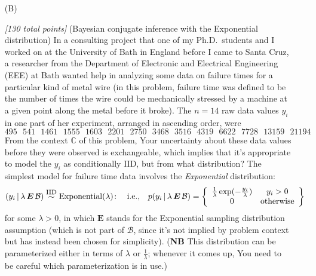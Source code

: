 \documentclass[12pt]{article}
\newcommand{\given}{\, | \,}
\newenvironment{solution}{\begin{proof}[\textbf{\textit{Solution}}] }{\end{proof}}
\begin{document}
\begin{itemize}
\begin{itemize}
\begin{tcolorbox}[breakable]
\begin{solution}
        \textbf{Policy Implications:} \\
        Good: 495,000 HIV+ people would be told know they have HIV+.

        Bad: 8,725,00 people would be told they're HIV+ when they're not.

        Because a gold standard test wasn't developed until later, this would be disastrous. This is because we're telling about 9 million Americans that they have HIV when they indeed don't. 

    \end{solution}
\end{tcolorbox}

\end{itemize}


\item[(B)]

\textit{[130 total points]} (Bayesian conjugate inference with the Exponential distribution) In a consulting project that one of my Ph.D.~students and I worked on at the University of Bath in England before I came to Santa Cruz, a researcher from the Department of Electronic and Electrical Engineering (EEE) at Bath wanted help in analyzing some data on failure times for a particular kind of metal wire (in this problem, failure time was defined to be the number of times the wire could be mechanically stressed by a machine at a given point along the metal before it broke). The $n = 14$ raw data values $y_i$ in one part of her experiment, arranged in ascending order, were 
\[ 
495 \ \ \ 541 \ \ \ 1461 \ \ \ 1555 \ \ \ 1603 \ \ \ 2201 \ \ \ 2750 \ \ \
3468 \ \ \ 3516 \ \ \ 4319 \ \ \ 6622 \ \ \ 7728 \ \ \ 13159 \ \ \ 21194 
\] 
From the context $\mathbb{ C }$ of this problem, Your uncertainty about these data values before they were observed is exchangeable, which implies that it's appropriate to model the $y_i$ as conditionally IID, but from what distribution?
The simplest model for failure time data involves the \textit{Exponential} distribution: 
\begin{equation} \label{e:exponential-model-1}
( y_i \given \lambda \, \bm{ E } \, \mathcal{ B } ) \stackrel{ \mbox{\footnotesize IID} }{ \sim } \textrm{Exponential} ( \lambda ) \! : \ \ \ \textrm{i.e.,} \ \ \ p( y_i \given \lambda \, \bm{ E } \, \mathcal{ B } ) = \left\{ \begin{array}{cc} \frac{ 1 }{ \lambda } \exp( - \frac{
y_i }{ \lambda } ) & y_i > 0 \\ 0 & \mbox{otherwise} \end{array} \right\}
\end{equation}
for some $\lambda > 0$, in which $\bm{ E }$ stands for the Exponential sampling distribution assumption (which is not part of $\mathcal{ B }$, since it's not implied by problem context but has instead been chosen for simplicity). (\textbf{NB} This distribution can be parameterized either in terms of $\lambda$ or $\frac{ 1 }{ \lambda }$; whenever it comes up, You need to be careful which parameterization is in use.)


\end{itemize}
\end{document}
